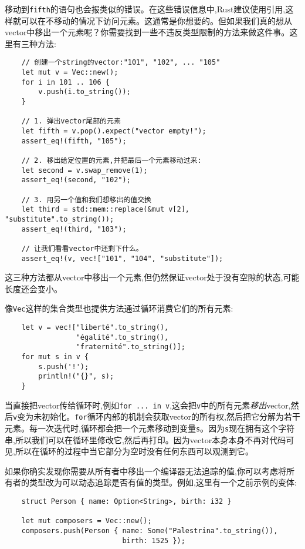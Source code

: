 移动到\texttt{fifth}的语句也会报类似的错误。在这些错误信息中,Rust建议使用引用,这样就可以在不移动的情况下访问元素。这通常是你想要的。但如果我们真的想从vector中移出一个元素呢？你需要找到一些不违反类型限制的方法来做这件事。这里有三种方法:
\begin{verbatim}
    // 创建一个string的vector:"101", "102", ... "105"
    let mut v = Vec::new();
    for i in 101 .. 106 {
        v.push(i.to_string());
    }

    // 1. 弹出vector尾部的元素
    let fifth = v.pop().expect("vector empty!");
    assert_eq!(fifth, "105");

    // 2. 移出给定位置的元素,并把最后一个元素移动过来:
    let second = v.swap_remove(1);
    assert_eq!(second, "102");

    // 3. 用另一个值和我们想移出的值交换
    let third = std::mem::replace(&mut v[2], "substitute".to_string());
    assert_eq!(third, "103");

    // 让我们看看vector中还剩下什么。
    assert_eq!(v, vec!["101", "104", "substitute"]);
\end{verbatim}

这三种方法都从vector中移出一个元素,但仍然保证vector处于没有空隙的状态,可能长度还会变小。

像\texttt{Vec}这样的集合类型也提供方法通过循环消费它们的所有元素:
\begin{verbatim}
    let v = vec!["liberté".to_string(),
                 "égalité".to_string(),
                 "fraternité".to_string()];
    for mut s in v {
        s.push('!');
        println!("{}", s);
    }
\end{verbatim}

当直接把vector传给循环时,例如\texttt{for ... in v},这会把\texttt{v}中的所有元素\emph{移出}vector,然后\texttt{v}变为未初始化。\texttt{for}循环内部的机制会获取vector的所有权,然后把它分解为若干元素。每一次迭代时,循环都会把一个元素移动到变量\texttt{s}。因为\texttt{s}现在拥有这个字符串,所以我们可以在循环里修改它,然后再打印。因为vector本身本身不再对代码可见,所以在循环的过程中当它部分为空时没有任何东西可以观测到它。

如果你确实发现你需要从所有者中移出一个编译器无法追踪的值,你可以考虑将所有者的类型改为可以动态追踪是否有值的类型。例如,这里有一个之前示例的变体:
\begin{verbatim}
    struct Person { name: Option<String>, birth: i32 }

    let mut composers = Vec::new();
    composers.push(Person { name: Some("Palestrina".to_string()),
                            birth: 1525 });
\end{verbatim}

